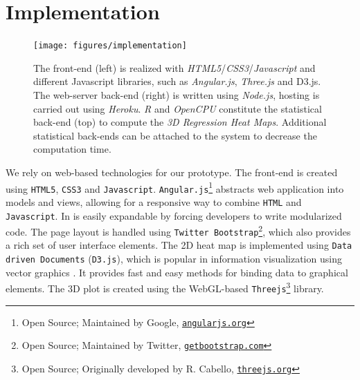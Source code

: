 \documentclass[journal]{style/vgtc} 			          %
\begin{document}
\section{Implementation} \label{implementation}
\begin{figure}[htb]
 \centering
 \texttt{[image: figures/implementation]}
 \caption{
 The front-end (left) is realized with \emph{HTML5}/\emph{CSS3}/\emph{Javascript} and different Javascript libraries, such as \emph{Angular.js}, \emph{Three.js} and D3.js.
 The web-server back-end (right) is written using \emph{Node.js}, hosting is carried out using \emph{Heroku}.
 \emph{R} and \emph{OpenCPU} constitute the statistical back-end (top) to compute the \emph{3D Regression Heat Maps}.
 Additional statistical back-ends can be attached to the system to decrease the computation time.
 }
  \label{fig:Implementation}
\end{figure}
We rely on web-based technologies for our prototype.
The front-end is created using \texttt{HTML5}, \texttt{CSS3} and \texttt{Javascript}.
\texttt{Angular.js}\footnote{Open Source; Maintained by Google, \href{https://www.angularjs.org/}{\texttt{angularjs.org}}} abstracts web application into models and views, allowing for a responsive way to combine \texttt{HTML} and \texttt{Javascript}.
In is easily expandable by forcing developers to write modularized code.
The page layout is handled using \texttt{Twitter Bootstrap}\footnote{Open Source; Maintained by Twitter, \href{http://getbootstrap.com}{\texttt{getbootstrap.com}}}, which also provides a rich set of user interface elements. %
The 2D heat map is implemented using \texttt{Data driven Documents} (\texttt{D3.js}), which is popular in information visualization using vector graphics \cite{D3}.
It provides fast and easy methods for binding data to graphical elements.
The 3D plot is created using the WebGL-based \texttt{Threejs}\footnote{Open Source; Originally developed by R. Cabello, \href{http://threejs.org}{\texttt{threejs.org}}} library.
\end{document}
